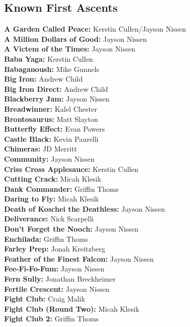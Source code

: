 \begin{flushleft}
\section{Known First Ascents}
\textbf{A Garden Called Peace:} Kerstin Cullen/Jayson Nissen\\
\textbf{A Million Dollars of Good:} Jayson Nissen\\
\textbf{A Victem of the Times:} Jayson Nissen\\
\textbf{Baba Yaga:} Kerstin Cullen\\
\textbf{Babaganoush:} Mike Gunnels\\
\textbf{Big Iron:} Andrew Child\\
\textbf{Big Iron Direct:} Andrew Child\\
\textbf{Blackberry Jam:} Jayson Nissen\\
\textbf{Breadwinner:} Kalel Chester\\
\textbf{Brontosaurus:} Matt Slayton\\
\textbf{Butterfly Effect:} Evan Powers\\
\textbf{Castle Black:} Kevin Paurelli\\
\textbf{Chimeras:} JD Merritt\\
\textbf{Community:} Jayson Nissen\\
\textbf{Criss Cross Applesauce:} Kerstin Cullen\\
\textbf{Cutting Crack:} Micah Klesik\\
\textbf{Dank Commander:} Griffin Thoms\\
\textbf{Daring to Fly:} Micah Klesik\\
\textbf{Death of Koschei the Deathless:} Jayson Nissen\\
\textbf{Deliverance:} Nick Scarpelli\\
\textbf{Don't Forget the Nooch:} Jayson Nissen\\
\textbf{Enchilada:} Griffin Thoms\\
\textbf{Farley Prep:} Jonah Kreitzberg\\
\textbf{Feather of the Finest Falcon:} Jayson Nissen\\
\textbf{Fee-Fi-Fo-Fum:} Jayson Nissen\\
\textbf{Fern Sully:} Jonathan Breckheimer\\
\textbf{Fertile Crescent:} Jayson Nissen\\
\textbf{Fight Club:} Craig Malik\\
\textbf{Fight Club (Round Two):} Micah Klesik\\
\textbf{Fight Club 2:} Griffin Thoms\\

\end{flushleft}
